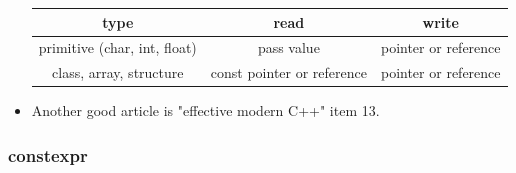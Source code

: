 \documentclass[a4paper,12pt,twoside]{book}
\begin{document}
\begin{itemize}
\begin{tabular}{|c|c|c|}
	\hline
	\textbf{type} & \textbf{read} & \textbf{write} \\
	\hline
	primitive (char, int, float) & pass value & pointer or reference \\
	\hline
	class, array, structure  & const pointer or reference &  pointer or reference  \\
	\hline
\end{tabular}


\item Another good article is "effective modern C++" item 13. 
\end{itemize}

\subsubsection{constexpr}
\end{document}
